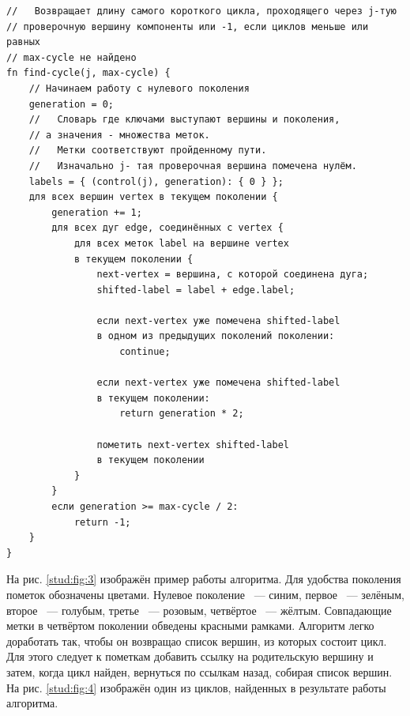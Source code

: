 \documentclass[14pt]{mmcs_article}
\begin{document}
\begin{lstlisting}[caption={Алгоритм поиска циклов}, label=stud:lst:1]
//   Возвращает длину самого короткого цикла, проходящего через j-тую
// проверочную вершину компоненты или -1, если циклов меньше или равных
// max-cycle не найдено
fn find-cycle(j, max-cycle) {
    // Начинаем работу с нулевого поколения
    generation = 0;
    //   Словарь где ключами выступают вершины и поколения,
    // а значения - множества меток.
    //   Метки соответствуют пройденному пути.
    //   Изначально j- тая проверочная вершина помечена нулём.
    labels = { (control(j), generation): { 0 } };
    для всех вершин vertex в текущем поколении {
        generation += 1;
        для всех дуг edge, соединённых с vertex {
            для всех меток label на вершине vertex
            в текущем поколении {
                next-vertex = вершина, с которой соединена дуга;
                shifted-label = label + edge.label;

                если next-vertex уже помечена shifted-label
                в одном из предыдущих поколений поколении:
                    continue;

                если next-vertex уже помечена shifted-label 
                в текущем поколении:
                    return generation * 2;
                
                пометить next-vertex shifted-label
                в текущем поколении
            }
        }
        если generation >= max-cycle / 2:
            return -1;
    }
}
\end{lstlisting}

На рис. \ref{stud:fig:3} изображён пример работы алгоритма. Для удобства поколения пометок обозначены цветами. Нулевое поколение ~--- синим, первое ~--- зелёным, второе ~--- голубым, третье ~--- розовым, четвёртое ~--- жёлтым. Совпадающие метки в четвёртом поколении обведены красными рамками. Алгоритм легко доработать так, чтобы он возвращао список вершин, из которых состоит цикл. Для этого следует к пометкам добавить ссылку на родительскую вершину и затем, когда цикл найден, вернуться по ссылкам назад, собирая список вершин. На рис. \ref{stud:fig:4} изображён один из циклов, найденных в результате работы алгоритма. 
\end{document}
